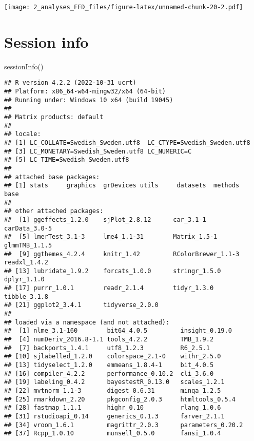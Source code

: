 \documentclass[
]{article}
\newenvironment{Shaded}{\begin{snugshade}}{\end{snugshade}}
\newcommand{\FunctionTok}[1]{\textcolor[rgb]{0.00,0.00,0.00}{#1}}
\newcommand{\NormalTok}[1]{#1}
\begin{document}
\texttt{[image: 2\_analyses\_FFD\_files/figure-latex/unnamed-chunk-20-2.pdf]}

\hypertarget{session-info}{%
\section{Session info}\label{session-info}}

\begin{Shaded}
\begin{Highlighting}[]
\FunctionTok{sessionInfo}\NormalTok{()}
\end{Highlighting}
\end{Shaded}

\begin{verbatim}
## R version 4.2.2 (2022-10-31 ucrt)
## Platform: x86_64-w64-mingw32/x64 (64-bit)
## Running under: Windows 10 x64 (build 19045)
## 
## Matrix products: default
## 
## locale:
## [1] LC_COLLATE=Swedish_Sweden.utf8  LC_CTYPE=Swedish_Sweden.utf8   
## [3] LC_MONETARY=Swedish_Sweden.utf8 LC_NUMERIC=C                   
## [5] LC_TIME=Swedish_Sweden.utf8    
## 
## attached base packages:
## [1] stats     graphics  grDevices utils     datasets  methods   base     
## 
## other attached packages:
##  [1] ggeffects_1.2.0    sjPlot_2.8.12      car_3.1-1          carData_3.0-5     
##  [5] lmerTest_3.1-3     lme4_1.1-31        Matrix_1.5-1       glmmTMB_1.1.5     
##  [9] ggthemes_4.2.4     knitr_1.42         RColorBrewer_1.1-3 readxl_1.4.2      
## [13] lubridate_1.9.2    forcats_1.0.0      stringr_1.5.0      dplyr_1.1.0       
## [17] purrr_1.0.1        readr_2.1.4        tidyr_1.3.0        tibble_3.1.8      
## [21] ggplot2_3.4.1      tidyverse_2.0.0   
## 
## loaded via a namespace (and not attached):
##  [1] nlme_3.1-160        bit64_4.0.5         insight_0.19.0     
##  [4] numDeriv_2016.8-1.1 tools_4.2.2         TMB_1.9.2          
##  [7] backports_1.4.1     utf8_1.2.3          R6_2.5.1           
## [10] sjlabelled_1.2.0    colorspace_2.1-0    withr_2.5.0        
## [13] tidyselect_1.2.0    emmeans_1.8.4-1     bit_4.0.5          
## [16] compiler_4.2.2      performance_0.10.2  cli_3.6.0          
## [19] labeling_0.4.2      bayestestR_0.13.0   scales_1.2.1       
## [22] mvtnorm_1.1-3       digest_0.6.31       minqa_1.2.5        
## [25] rmarkdown_2.20      pkgconfig_2.0.3     htmltools_0.5.4    
## [28] fastmap_1.1.1       highr_0.10          rlang_1.0.6        
## [31] rstudioapi_0.14     generics_0.1.3      farver_2.1.1       
## [34] vroom_1.6.1         magrittr_2.0.3      parameters_0.20.2  
## [37] Rcpp_1.0.10         munsell_0.5.0       fansi_1.0.4        

\end{verbatim}
\end{document}
